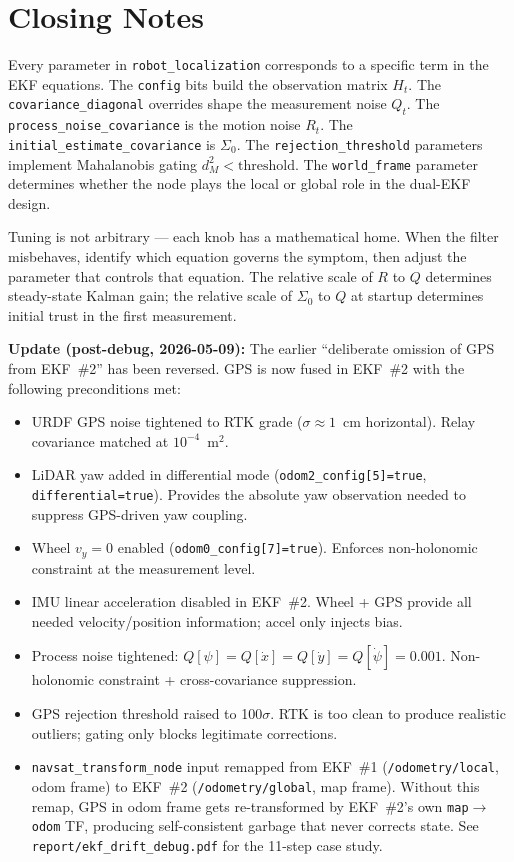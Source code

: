\documentclass[11pt,a4paper]{article}
\begin{document}
\section*{Closing Notes}

Every parameter in \texttt{robot\_localization} corresponds to a specific term in the EKF equations. The \texttt{config} bits build the observation matrix $H_t$. The \texttt{covariance\_diagonal} overrides shape the measurement noise $Q_t$. The \texttt{process\_noise\_covariance} is the motion noise $R_t$. The \texttt{initial\_estimate\_covariance} is $\Sigma_0$. The \texttt{rejection\_threshold} parameters implement Mahalanobis gating $d_M^2 < \text{threshold}$. The \texttt{world\_frame} parameter determines whether the node plays the local or global role in the dual-EKF design.

Tuning is not arbitrary --- each knob has a mathematical home. When the filter misbehaves, identify which equation governs the symptom, then adjust the parameter that controls that equation. The relative scale of $R$ to $Q$ determines steady-state Kalman gain; the relative scale of $\Sigma_0$ to $Q$ at startup determines initial trust in the first measurement.

\textbf{Update (post-debug, 2026-05-09):} The earlier ``deliberate omission of GPS from EKF~\#2'' has been reversed. GPS is now fused in EKF~\#2 with the following preconditions met:
\begin{itemize}[noitemsep]
\item URDF GPS noise tightened to RTK grade ($\sigma\!\approx\!1$~cm horizontal). Relay covariance matched at $10^{-4}$~m$^2$.
\item LiDAR yaw added in differential mode (\texttt{odom2\_config[5]=true}, \texttt{differential=true}). Provides the absolute yaw observation needed to suppress GPS-driven yaw coupling.
\item Wheel $v_y\!=\!0$ enabled (\texttt{odom0\_config[7]=true}). Enforces non-holonomic constraint at the measurement level.
\item IMU linear acceleration disabled in EKF~\#2. Wheel + GPS provide all needed velocity/position information; accel only injects bias.
\item Process noise tightened: $Q[\psi]=Q[\dot{x}]=Q[\dot{y}]=Q[\dot{\psi}]=0.001$. Non-holonomic constraint + cross-covariance suppression.
\item GPS rejection threshold raised to 100$\sigma$. RTK is too clean to produce realistic outliers; gating only blocks legitimate corrections.
\item \texttt{navsat\_transform\_node} input remapped from EKF~\#1 (\texttt{/odometry/local}, odom frame) to EKF~\#2 (\texttt{/odometry/global}, map frame). Without this remap, GPS in odom frame gets re-transformed by EKF~\#2's own \texttt{map}$\to$\texttt{odom} TF, producing self-consistent garbage that never corrects state. See \texttt{report/ekf\_drift\_debug.pdf} for the 11-step case study.
\end{itemize}
\end{document}

